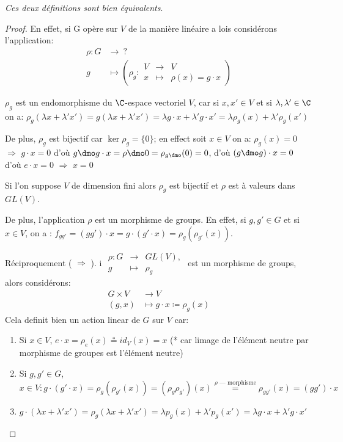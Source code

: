 \emph{Ces deux définitions sont bien équivalents}.
\begin{proof}
En effet, si G opère sur $V$ de la manière linéaire a lois considérons l'application:
\begin{align*}	
	\rho:G &\rightarrow \ ? \\
	g &\mapsto  \left(\rho_g:\begin{array}{rcl}V&\rightarrow& V \\ x&\mapsto&\rho(x)=g\cdot x\end{array}\right)
\end{align*}

$\rho_g$ est un endomorphisme du $\C$-espace vectoriel $V$, car si $x,x'\in V$ et si $\lambda, \lambda'\in \C$ on a:
$\rho_g(\lambda x + \lambda' x')=g(\lambda x+\lambda' x')=\lambda g\cdot x+\lambda'g\cdot x'=\lambda\rho_g(x)+\lambda'\rho_g(x')$

De plus, $\rho_g$ est bijectif car $\ker\rho_g=\{0\}$; en effect soit $x\in V$ on a: $\rho_g(x)=0$  $\Rightarrow$  $g\cdot x=0$ d'où $g\dmo g\cdot x= \rho\dmo 0=\rho_{g\dmo}(0)=0$,
d'où $(g\dmo g)\cdot x=0$ d'où $e\cdot x=0$  $\Rightarrow$  $x=0$

Si l'on suppose $V$ de dimension fini alors $\rho_g$ est bijectif et $\rho$ est à valeurs dans $GL(V)$.

De plus, l'application $\rho$ est un morphisme de groups. En effet, si $g,g'\in G$ et si $x\in V$, on a : $f_{gg'}=(gg')\cdot x= g\cdot (g'\cdot x)=\rho_g(\rho_{g'}(x))$.

Réciproquement ( $\Rightarrow$ ).
i $\begin{array}{rcl}\rho: G &\rightarrow & GL(V),\\ g &\mapsto &\rho_g\end{array}$ est un morphisme de groups, alors considérons: 
\begin{align*}
G\times V &\rightarrow  V\\ (g,x) &\mapsto g\cdot x\coloneq\rho_g(x)
\end{align*}
Cela definit bien un action linear de $G$ sur $V$ car:
\begin{enumerate}
	\item Si $x\in V$, $e\cdot x=\rho_e(x) \overset\ast= id_V(x)=x$ (* car limage de l'élément neutre par morphisme de groupes est l'élément neutre)
	\item Si $g,g'\in G$, $x\in V: g\cdot(g'\cdot x)=\rho_g(\rho_{g'}(x))=(\rho_g\rho_{g'})(x)\overset{\rho\text{ --- morphisme}}{=}\rho_{gg'}(x)=(gg')\cdot x$
	\item $g\cdot (\lambda x+\lambda'x')=\rho_g(\lambda x+\lambda' x')= \lambda p_g(x)+\lambda' p_g(x')=\lambda g\cdot x+\lambda'g\cdot x'$
\end{enumerate}
\end{proof}

